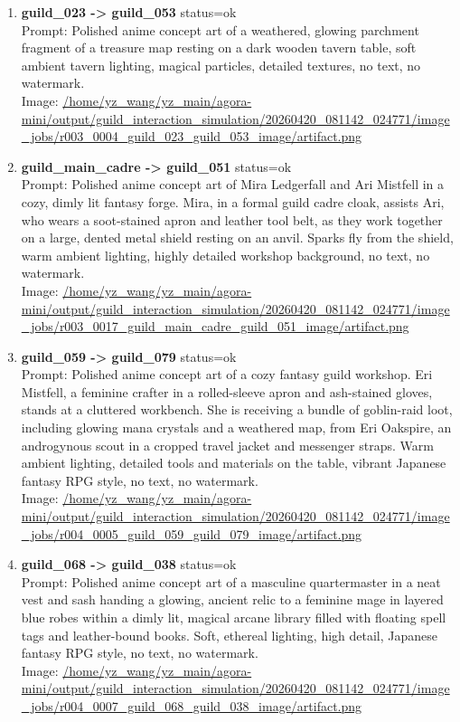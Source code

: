 \documentclass[11pt,a4paper]{article}
\begin{document}
\begin{enumerate}
\item \textbf{guild\_023 -> guild\_053} status=ok\\\newline Prompt: Polished anime concept art of a weathered, glowing parchment fragment of a treasure map resting on a dark wooden tavern table, soft ambient tavern lighting, magical particles, detailed textures, no text, no watermark.\\\newline Image: \url{/home/yz\_wang/yz\_main/agora-mini/output/guild\_interaction\_simulation/20260420\_081142\_024771/image\_jobs/r003\_0004\_guild\_023\_guild\_053\_image/artifact.png}
\item \textbf{guild\_main\_cadre -> guild\_051} status=ok\\\newline Prompt: Polished anime concept art of Mira Ledgerfall and Ari Mistfell in a cozy, dimly lit fantasy forge. Mira, in a formal guild cadre cloak, assists Ari, who wears a soot-stained apron and leather tool belt, as they work together on a large, dented metal shield resting on an anvil. Sparks fly from the shield, warm ambient lighting, highly detailed workshop background, no text, no watermark.\\\newline Image: \url{/home/yz\_wang/yz\_main/agora-mini/output/guild\_interaction\_simulation/20260420\_081142\_024771/image\_jobs/r003\_0017\_guild\_main\_cadre\_guild\_051\_image/artifact.png}
\item \textbf{guild\_059 -> guild\_079} status=ok\\\newline Prompt: Polished anime concept art of a cozy fantasy guild workshop. Eri Mistfell, a feminine crafter in a rolled-sleeve apron and ash-stained gloves, stands at a cluttered workbench. She is receiving a bundle of goblin-raid loot, including glowing mana crystals and a weathered map, from Eri Oakspire, an androgynous scout in a cropped travel jacket and messenger straps. Warm ambient lighting, detailed tools and materials on the table, vibrant Japanese fantasy RPG style, no text, no watermark.\\\newline Image: \url{/home/yz\_wang/yz\_main/agora-mini/output/guild\_interaction\_simulation/20260420\_081142\_024771/image\_jobs/r004\_0005\_guild\_059\_guild\_079\_image/artifact.png}
\item \textbf{guild\_068 -> guild\_038} status=ok\\\newline Prompt: Polished anime concept art of a masculine quartermaster in a neat vest and sash handing a glowing, ancient relic to a feminine mage in layered blue robes within a dimly lit, magical arcane library filled with floating spell tags and leather-bound books. Soft, ethereal lighting, high detail, Japanese fantasy RPG style, no text, no watermark.\\\newline Image: \url{/home/yz\_wang/yz\_main/agora-mini/output/guild\_interaction\_simulation/20260420\_081142\_024771/image\_jobs/r004\_0007\_guild\_068\_guild\_038\_image/artifact.png}

\end{enumerate}
\end{document}
